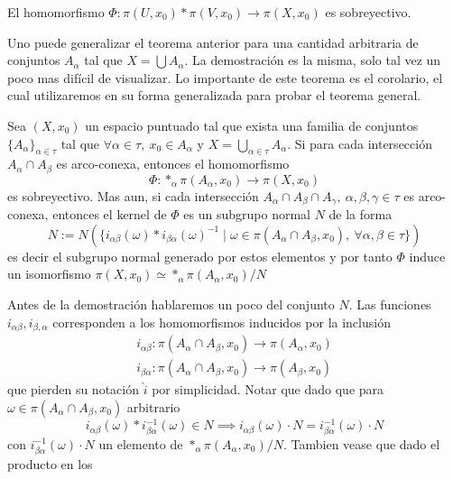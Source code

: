 \begin{corolario}\label{cor:sobre-van}
  El homomorfismo \(\Phi : \pi (U, x_0) * \pi (V, x_0) \to \pi (X,
  x_0)\) es sobreyectivo.
\end{corolario}
Uno puede generalizar el teorema anterior para una cantidad arbitraria
de conjuntos \(A_\alpha\) tal que \(X = \bigcup A_\alpha\). La
demostración es la misma, solo tal vez un poco mas difícil de
visualizar. Lo importante de este teorema es el corolario, el cual
utilizaremos en su forma generalizada para probar el teorema general.

\begin{teorema}
  Sea \((X, x_0)\) un espacio puntuado tal que exista una familia de
  conjuntos \(\{A_\alpha\}_{\alpha \in \tau}\) tal que \(\forall \alpha
  \in \tau,\ x_0 \in
  A_\alpha\) y \( X = \bigcup_{\alpha \in \tau} A_\alpha\). Si para cada
  intersección \(A_\alpha \cap A_\beta\) es arco-conexa, entonces el
  homomorfismo
  \[ \Phi : *_\alpha \pi (A_\alpha, x_0) \to \pi (X, x_0) \]
  es sobreyectivo. Mas aun, si cada intersección \(A_\alpha \cap A_\beta
  \cap A_\gamma,\ \alpha, \beta, \gamma \in \tau\) es arco-conexa,
  entonces el kernel de \(\Phi\) es un subgrupo normal \(N\) de la forma
  \[
    N := N \left( \{ i_{\alpha \beta} (\omega) * i_{\beta \alpha} (\omega)^{-1}
    \mid \omega \in \pi \left( A_\alpha \cap A_\beta, x_0 \right),\
    \forall \alpha ,\beta \in \tau \} \right)
  \]
  es decir el subgrupo normal generado por estos elementos y por tanto
  \(\Phi\) induce un isomorfismo \(\pi (X, x_0) \simeq *_\alpha \pi
  (A_\alpha, x_0) / N \)
\end{teorema}
Antes de la demostración hablaremos un poco del conjunto \(N\). Las
funciones \(i_{\alpha \beta}, i_{\beta, \alpha}\) corresponden a los
homomorfismos inducidos por la inclusión
\begin{gather*}
  i_{\alpha \beta} : \pi (A_\alpha \cap A_\beta , x_0 ) \longrightarrow \pi (A_\alpha, x_0) \\
  i_{\beta \alpha} : \pi (A_\alpha \cap A_\beta , x_0 ) \longrightarrow \pi (A_\beta, x_0)
\end{gather*}
que pierden su notación \(\hat i\) por simplicidad. Notar que dado que
para \(\omega \in \pi (A_\alpha \cap A_\beta , x_0)\) arbitrario
\[ i_{\alpha \beta} (\omega) * i_{\beta \alpha}^{-1} (\omega) \in N
  \implies i_{\alpha \beta} (\omega) \cdot N = i_{\beta
\alpha}^{-1} (\omega) \cdot N \]
con \(i_{\beta \alpha}^{-1} (\omega) \cdot N\) un elemento de \(*_\alpha
\pi (A_\alpha , x_0) / N\). Tambien vease que dado el producto en los
